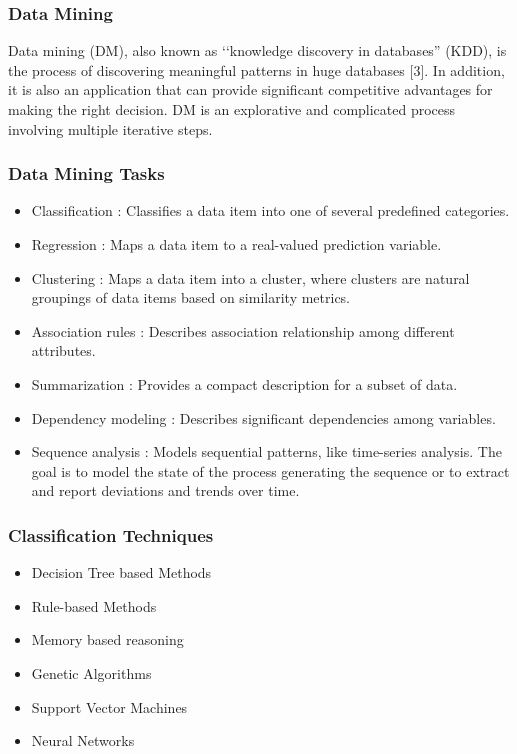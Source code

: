 \documentclass[a4paper,14pt,onecolumn]{article}
\begin{document}
\subsubsection{ Data Mining}
                       Data mining (DM), also known as ‘‘knowledge discovery in databases” (KDD), is the process of discovering meaningful patterns in huge databases [3]. In addition, it is also an application that can provide significant competitive advantages for making the right decision.  DM is an explorative and complicated process involving multiple iterative steps.

\subsubsection{Data Mining Tasks}
  \begin{itemize}
\item Classification              : Classifies a data item into one of several predefined categories.

\item Regression                 : Maps a data item to a real-valued prediction variable.

\item Clustering                  : Maps a data item into a cluster, where clusters are natural groupings of data items based on similarity metrics.

\item Association rules        : Describes association relationship among different attributes.

\item Summarization           : Provides a compact description for a subset of data.

\item Dependency modeling : Describes significant dependencies among variables.

\item Sequence analysis       : Models sequential patterns, like time-series analysis. The goal  is to model the state of the process generating the sequence or to extract and  report deviations and trends over time.
\end{itemize}

 \subsubsection{Classification Techniques} \begin{itemize}
\item Decision Tree based Methods
\item Rule-based Methods
\item Memory based reasoning
\item Genetic Algorithms
\item Support Vector Machines
\item Neural Networks 
\end{itemize}
\end{document}

